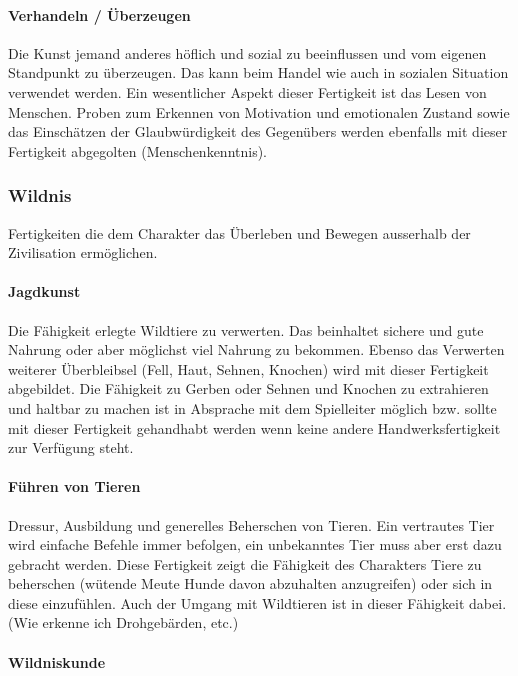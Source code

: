 \documentclass{article}
\begin{document}
\paragraph{Verhandeln / Überzeugen}

Die Kunst jemand anderes höflich und sozial zu beeinflussen und vom eigenen Standpunkt zu überzeugen. Das kann beim
Handel wie auch in sozialen Situation verwendet werden. Ein wesentlicher Aspekt dieser Fertigkeit ist das Lesen von
Menschen. Proben zum Erkennen von Motivation und emotionalen Zustand sowie das Einschätzen der Glaubwürdigkeit des
Gegenübers werden ebenfalls mit dieser Fertigkeit abgegolten (Menschenkenntnis).

\subsubsection{Wildnis}

Fertigkeiten die dem Charakter das Überleben und Bewegen ausserhalb der Zivilisation ermöglichen.

\paragraph{Jagdkunst}

Die Fähigkeit erlegte Wildtiere zu verwerten. Das beinhaltet sichere und gute Nahrung oder aber möglichst viel
Nahrung zu bekommen. Ebenso das Verwerten weiterer Überbleibsel (Fell, Haut, Sehnen, Knochen) wird mit dieser
Fertigkeit abgebildet. Die Fähigkeit zu Gerben oder Sehnen und Knochen zu extrahieren und haltbar zu machen ist
in Absprache mit dem Spielleiter möglich bzw. sollte mit dieser Fertigkeit gehandhabt werden wenn keine andere
Handwerksfertigkeit zur Verfügung steht.

\paragraph{Führen von Tieren}

Dressur, Ausbildung und generelles Beherschen von Tieren. Ein vertrautes Tier wird einfache Befehle immer befolgen,
ein unbekanntes Tier muss aber erst dazu gebracht werden. Diese Fertigkeit zeigt die Fähigkeit des Charakters Tiere
zu beherschen (wütende Meute Hunde davon abzuhalten anzugreifen) oder sich in diese einzufühlen. Auch der Umgang mit
Wildtieren ist in dieser Fähigkeit dabei. (Wie erkenne ich Drohgebärden, etc.)

\paragraph{Wildniskunde}
\end{document}

